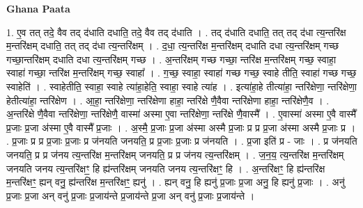 \documentclass[17pt]{extarticle}
\begin{document}
\textbf{Ghana Paata } \newline

1. ए॒व तत् तदे॒ वैव तद् द॑धाति दधाति॒ तदे॒ वैव तद् द॑धाति । . तद् द॑धाति दधाति॒ तत् तद् द॑धा त्य॒न्तरि॑क्ष म॒न्तरि॑क्षम् दधाति॒ तत् तद् द॑धा त्य॒न्तरि॑क्षम् । . द॒धा॒ त्य॒न्तरि॑क्ष म॒न्तरि॑क्षम् दधाति दधा त्य॒न्तरि॑क्षम् गच्छ गच्छा॒न्तरि॑क्षम् दधाति दधा त्य॒न्तरि॑क्षम् गच्छ । . अ॒न्तरि॑क्षम् गच्छ गच्छा॒ न्तरि॑क्ष म॒न्तरि॑क्षम् गच्छ॒ स्वाहा॒ स्वाहा॑ गच्छा॒ न्तरि॑क्ष म॒न्तरि॑क्षम् गच्छ॒ स्वाहा᳚ । . ग॒च्छ॒ स्वाहा॒ स्वाहा॑ गच्छ गच्छ॒ स्वाहे तीति॒ स्वाहा॑ गच्छ गच्छ॒ स्वाहेति॑ । . स्वाहेतीति॒ स्वाहा॒ स्वाहे त्या॑हा॒हेति॒ स्वाहा॒ स्वाहे त्या॑ह । . इत्या॑हा॒हे तीत्या॑हा॒ न्तरि॑क्षेणा॒ न्तरि॑क्षेणा॒ हेतीत्या॑हा॒ न्तरि॑क्षेण । . आ॒हा॒ न्तरि॑क्षेणा॒ न्तरि॑क्षेणा हाहा॒ न्तरि॑क्षे णै॒वैवा न्तरि॑क्षेणा हाहा॒ न्तरि॑क्षेणै॒व । . अ॒न्तरि॑क्षे णै॒वैवा न्तरि॑क्षेणा॒ न्तरि॑क्षेणै॒ वास्मा॑ अस्मा ए॒वा न्तरि॑क्षेणा॒ न्तरि॑क्षे णै॒वास्मै᳚ । . ए॒वास्मा॑ अस्मा ए॒वै वास्मै᳚ प्र॒जाः प्र॒जा अ॑स्मा ए॒वै वास्मै᳚ प्र॒जाः । . अ॒स्मै॒ प्र॒जाः प्र॒जा अ॑स्मा अस्मै प्र॒जाः प्र प्र प्र॒जा अ॑स्मा अस्मै प्र॒जाः प्र । . प्र॒जाः प्र प्र प्र॒जाः प्र॒जाः प्र ज॑नयति जनयति॒ प्र प्र॒जाः प्र॒जाः प्र ज॑नयति । . प्र॒जा इति॑ प्र - जाः । . प्र ज॑नयति जनयति॒ प्र प्र ज॑नय त्य॒न्तरि॑क्ष म॒न्तरि॑क्षम् जनयति॒ प्र प्र ज॑नय त्य॒न्तरि॑क्षम् । . ज॒न॒य॒ त्य॒न्तरि॑क्ष म॒न्तरि॑क्षम् जनयति जनय त्य॒न्तरि॑क्षꣳ॒॒ हि ह्य॑न्तरि॑क्षम् जनयति जनय त्य॒न्तरि॑क्षꣳ॒॒ हि । . अ॒न्तरि॑क्षꣳ॒॒ हि ह्य॑न्तरि॑क्ष म॒न्तरि॑क्षꣳ॒॒ ह्यन् वनु॒ ह्य॑न्तरि॑क्ष म॒न्तरि॑क्षꣳ॒॒ ह्यनु॑ । . ह्यन् वनु॒ हि ह्यनु॑ प्र॒जाः प्र॒जा अनु॒ हि ह्यनु॑ प्र॒जाः । . अनु॑ प्र॒जाः प्र॒जा अन् वनु॑ प्र॒जाः प्र॒जाय॑न्ते प्र॒जाय॑न्ते प्र॒जा अन् वनु॑ प्र॒जाः प्र॒जाय॑न्ते । \newline
\end{document}
